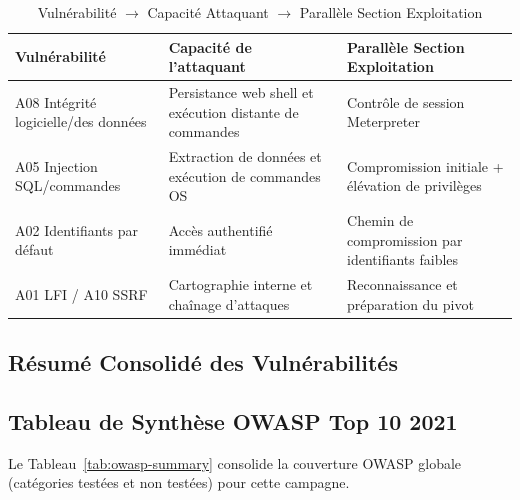 \documentclass[12pt,a4paper,openany]{report}
\newcommand{\tableheadcolor}{\rowcolor{tableheadbg}}
\begin{document}
	\begin{table}[H]
		\centering
		\renewcommand{\arraystretch}{1.4}
		\setlength{\arrayrulewidth}{0.5pt}
		\begin{tabular}{p{} p{} p{}}
			\arrayrulecolor{tableborder}
			\hline
			\tableheadcolor
			\textcolor{tableheadfg}{\textbf{Vulnérabilité}} &
			\textcolor{tableheadfg}{\textbf{Capacité de l'attaquant}} &
			\textcolor{tableheadfg}{\textbf{Parallèle Section Exploitation}} \\
			\hline
			\rowcolor{tablerowalt}
			A08 Intégrité logicielle/des données & Persistance web shell et exécution distante de commandes & Contrôle de session Meterpreter \\
			A05 Injection SQL/commandes & Extraction de données et exécution de commandes OS & Compromission initiale + élévation de privilèges \\
			\rowcolor{tablerowalt}
			A02 Identifiants par défaut & Accès authentifié immédiat & Chemin de compromission par identifiants faibles \\
			A01 LFI / A10 SSRF & Cartographie interne et chaînage d'attaques & Reconnaissance et préparation du pivot \\
			\hline
		\end{tabular}
		\caption{Vulnérabilité $\rightarrow$ Capacité Attaquant $\rightarrow$ Parallèle Section Exploitation}
		\label{tab:dvwa-postexploit-results}
	\end{table}
	
	
	
	\subsection{Résumé Consolidé des Vulnérabilités}
	
	\subsection{Tableau de Synthèse OWASP Top 10 2021}
	Le Tableau~\ref{tab:owasp-summary} consolide la couverture OWASP globale (catégories testées et non testées) pour cette campagne.
	
\end{document}
